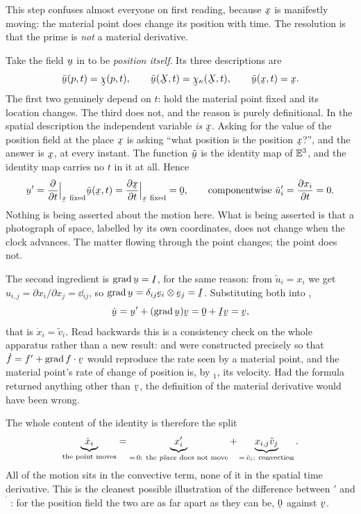 \begin{remark}[why $\bx'=\bze$, and why this is not circular]\label{rem:xprime}
This step confuses almost everyone on first reading, because $\bx$ is
manifestly moving: the material point does change its position with time.
The resolution is that the prime is \emph{not} a material derivative.

Take the field $\bu$ in  to be \emph{position itself}. Its three
descriptions are
\[
   \bar\bu(p,t)=\bchi(p,t),\qquad
   \hat\bu(\bX,t)=\bchi_\kappa(\bX,t),\qquad
   \tilde\bu(\bx,t)=\bx .
\]
The first two genuinely depend on $t$: hold the material point fixed and its
location changes. The third does not, and the reason is purely definitional.
In the spatial description the independent variable \emph{is} $\bx$. Asking
for the value of the position field at the place $\bx$ is asking ``what
position is the position $\bx$?'', and the answer is $\bx$, at every instant.
The function $\tilde\bu$ is the identity map of $\mathbb{E}^{3}$, and the identity map
carries no $t$ in it at all. Hence
\[
   \bu'=\frac{\partial}{\partial t}\Big|_{\bx\ \mathrm{fixed}}\tilde\bu(\bx,t)
       =\frac{\partial\bx}{\partial t}\Big|_{\bx\ \mathrm{fixed}}=\bze,
   \qquad\text{componentwise } \tilde u_i'=\frac{\partial x_i}{\partial t}=0 .
\]
Nothing is being asserted about the motion here. What is being asserted is
that a photograph of space, labelled by its own coordinates, does not change
when the clock advances. The matter flowing through the point changes; the
point does not.

The second ingredient is $\grad\bu=\I$, for the same reason: from
$\tilde u_i=x_i$ we get $u_{i,j}=\partial x_i/\partial x_j=\dd_{ij}$, so
$\grad\bu=\dd_{ij}\be_i\otimes\be_j=\I$. Substituting both into ,
\[
   \dot\bu=\bu'+(\grad\bu)\bv=\bze+\I\bv=\bv,
\]
that is $\dot x_i=\tilde v_i$. Read backwards this is a consistency check on
the whole apparatus rather than a new result:  and  were
constructed precisely so that $\dot f=f'+\grad f\cdot\bv$ would reproduce the
rate seen by a material point, and the material point's rate of change of
position is, by $_1$, its velocity. Had the formula returned anything
other than $\bv$, the definition of the material derivative would have been
wrong.

The whole content of the identity is therefore the split
\[
   \underbrace{\dot x_i}_{\text{the point moves}}
   =\underbrace{x_i'}_{=\,0:\ \text{the \emph{place} does not move}}
   +\underbrace{x_{i,j}\tilde v_j}_{=\,\tilde v_i:\ \text{convection}}.
\]
All of the motion sits in the convective term, none of it in the spatial
time derivative. This is the cleanest possible illustration of the difference
between $'$ and $\dot{\phantom{f}}$: for the position field the two are as
far apart as they can be, $\bze$ against $\bv$.
\end{remark}

